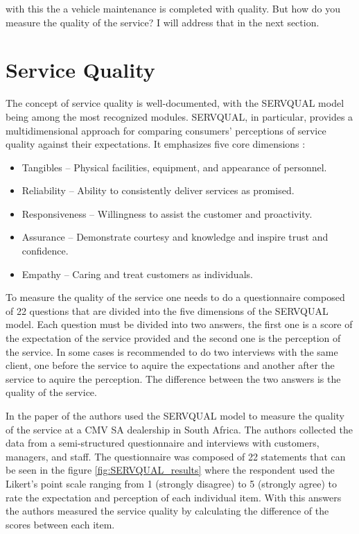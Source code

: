 with this the a vehicle maintenance is completed with quality. 
But how do you measure the quality of the service?
I will address that in the next section.

\section{Service Quality}
The concept of service quality is well-documented, with the SERVQUAL model being among the most recognized modules. 
SERVQUAL, in particular, provides a multidimensional approach for comparing consumers' perceptions of service quality against their expectations. 
It emphasizes five core dimensions \cite{SERVQUAL_OLD}:

\begin{itemize}
  \item Tangibles – Physical facilities, equipment, and appearance of personnel.
  \item Reliability – Ability to consistently deliver services as promised.
  \item Responsiveness – Willingness to assist the customer and proactivity.
  \item Assurance – Demonstrate courtesy and knowledge and inspire trust and confidence.
  \item Empathy – Caring and treat customers as individuals.
\end{itemize}

To measure the quality of the service one needs to do a questionnaire composed of 22 questions that are divided into the five dimensions of the SERVQUAL model. \cite{Measuring_After_sales_Service_Quality}
Each question must be divided into two answers, the first one is a score of the expectation of the service provided and the second one is the perception of the service. \cite{Measuring_After_sales_Service_Quality}
In some cases is recommended to do two interviews with the same client, one before the service to aquire the expectations and another after the service to aquire the perception. \cite{servqual_blog_da_qualidade}
The difference between the two answers is the quality of the service. \cite{servqual_blog_da_qualidade} \cite{Measuring_After_sales_Service_Quality} \cite{SERVQUAL_OLD}

In the paper of \cite{Measuring_After_sales_Service_Quality} the authors used the SERVQUAL model to measure the quality of the service at a CMV SA dealership in South Africa.
The authors collected the data from a semi-structured questionnaire and interviews with customers, managers, and staff.
The questionnaire was composed of 22 statements that can be seen in the figure \ref{fig:SERVQUAL_results} where the respondent used the Likert's point scale ranging from 1 (strongly disagree) to 5 (strongly agree) to rate the expectation and perception of each individual item.
With this answers the authors measured the service quality by calculating the difference of the scores between each item.
 
